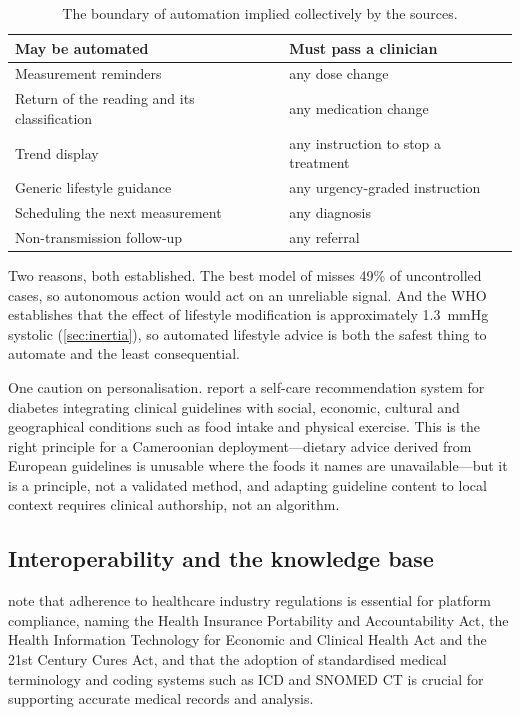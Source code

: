 \documentclass[12pt,a4paper,oneside]{report}
\begin{document}
\begin{table}[htbp]
\centering\small
\caption{The boundary of automation implied collectively by the sources.}\label{tab:automation-boundary}
\begin{tabularx}{\textwidth}{@{}X X@{}}
\toprule
\textbf{May be automated} & \textbf{Must pass a clinician} \\
\midrule
Measurement reminders & any dose change \\
Return of the reading and its classification & any medication change \\
Trend display & any instruction to stop a treatment \\
Generic lifestyle guidance & any urgency-graded instruction \\
Scheduling the next measurement & any diagnosis \\
Non-transmission follow-up & any referral \\
\bottomrule
\end{tabularx}
\end{table}

Two reasons, both established. The best model of \textcite{mendoza2025} misses 49\% of uncontrolled cases, so autonomous action would act on an unreliable signal. And the WHO establishes that the effect of lifestyle modification is approximately 1.3~mmHg systolic (\cref{sec:inertia}), so automated lifestyle advice is both the safest thing to automate and the least consequential.

One caution on personalisation. \Textcite{liu2025review} report a self-care recommendation system for diabetes integrating clinical guidelines with social, economic, cultural and geographical conditions such as food intake and physical exercise. This is the right principle for a Cameroonian deployment---dietary advice derived from European guidelines is unusable where the foods it names are unavailable---but it is a principle, not a validated method, and adapting guideline content to local context requires clinical authorship, not an algorithm.

\subsection{Interoperability and the knowledge base}\label{sec:interop}

\Textcite{liu2025review} note that adherence to healthcare industry regulations is essential for platform compliance, naming the Health Insurance Portability and Accountability Act, the Health Information Technology for Economic and Clinical Health Act and the 21st Century Cures Act, and that the adoption of standardised medical terminology and coding systems such as ICD and SNOMED CT is crucial for supporting accurate medical records and analysis.
\end{document}
